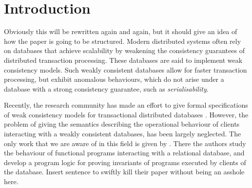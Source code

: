 \section{Introduction}
\ac{Obviously this will be rewritten again and again, but it should give 
an idea of how the paper is going to be structured.}
Modern distributed systems often rely on databases that achieve scalability by weakening the
consistency guarantees of distributed transaction processing. These databases are said
to implement weak consistency models. Such weakly consistent databases allow for faster
transaction processing, but exhibit anomalous behaviours, which do not arise under a database
with a strong consistency guarantee, such as \emph{serialisability}. 

Recently, the research community has made an effort to give formal specifications of weak consistency 
models for transactional distributed databases \cite{ev_transactions,framework-concur,consistency3d,seebelieve,laws,alonetogether}. 
However, the problem of giving the semantics describing the operational behaviour of 
clients interacting with a weakly consistent databases, has been largely neglected. The only 
work that we are aware of in this field is given by \cite{alonetogether}. There the authors 
study the behaviour of functional programs interacting with a relational database, and develop 
a program logic for proving invariants of programs executed by clients of the database. 
\ac{Insert sentence to swiftly kill their paper without being an asshole here.}


